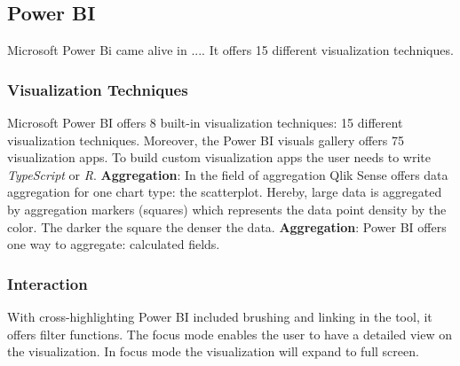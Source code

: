 \subsection{Power BI}
Microsoft Power Bi came alive in .... It offers 15 different visualization techniques. 

\subsubsection*{Visualization Techniques}
Microsoft Power BI offers 8 built-in visualization techniques: 15 different visualization techniques. Moreover, the Power BI visuals gallery offers 75 visualization apps. To build custom visualization apps the user needs to write \textit{TypeScript} or \textit{R}.
\textbf{Aggregation}: In the field of aggregation Qlik Sense offers data aggregation for one chart type: the scatterplot. Hereby, large data is aggregated by aggregation markers (squares) which represents the data point density by the color. The darker the square the denser the data\cite{qlikScatter}. 
\textbf{Aggregation}: Power BI offers one way to aggregate: calculated fields.
\subsubsection*{Interaction}
With cross-highlighting Power BI included brushing and linking in the tool\cite{powerbiInteract}, it offers filter functions. The focus mode enables the user to have a detailed view on the visualization. In focus mode the visualization will expand to full screen.  